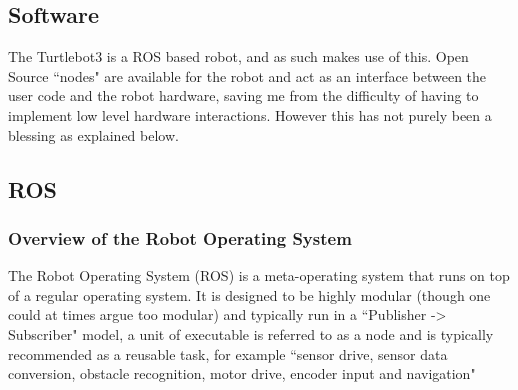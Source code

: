 \documentclass[10pt,a4paper]{report}
\begin{document}
		\subsection*{Software}
			The Turtlebot3 is a ROS based robot, and as such makes use of this. Open Source ``nodes" are available for the robot and act as an interface between the user code and the robot hardware, saving me from the difficulty of having to implement low level hardware interactions. However this has not purely been a blessing as explained below.			
	\subsection*{ROS}
		\subsubsection*{Overview of the Robot Operating System}
			The Robot Operating System (ROS) is a meta-operating system that runs on top of a regular operating system. It is designed to be highly modular (though one could at times argue too modular) and typically run in a ``Publisher -> Subscriber" model, a unit of executable is referred to as a node and is typically recommended as a reusable task, for example ``sensor drive, sensor data conversion, obstacle recognition, motor drive, encoder input and navigation"\cite{pyo_ros_en_2017}
\end{document}

